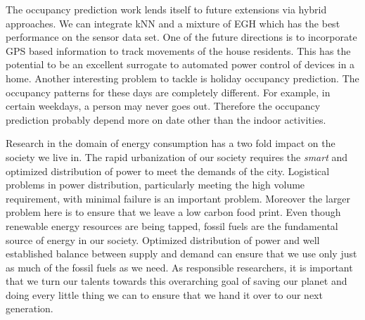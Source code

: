 The occupancy prediction work lends itself to future extensions via hybrid approaches. We can integrate kNN and a mixture of EGH which has the best performance on the sensor data set. One of the future directions is to incorporate GPS based information to track movements of the house residents. This has the potential to be an excellent surrogate to automated power control of devices in a home. Another interesting problem to tackle is holiday occupancy prediction. The occupancy patterns for these days are completely different. For example, in certain weekdays, a person may never goes out. Therefore the occupancy prediction probably depend more on date other than the indoor activities. 

Research in the domain of energy consumption has a two fold impact on the society we live in. The rapid urbanization of our society requires the \emph{smart} and optimized distribution of power to meet the demands of the city. Logistical problems in power distribution, particularly meeting the high volume requirement, with minimal failure is an important problem. Moreover the larger problem here is to ensure that we leave a low carbon food print. Even though renewable energy resources are being tapped, fossil fuels are the fundamental source of energy in our society. Optimized distribution of power and well established balance between supply and demand can ensure that we use only just as much of the fossil fuels as we need. As responsible researchers, it is important that we turn our talents towards this overarching goal of saving our planet and doing every little thing we can to ensure that we hand it over to our next generation.
